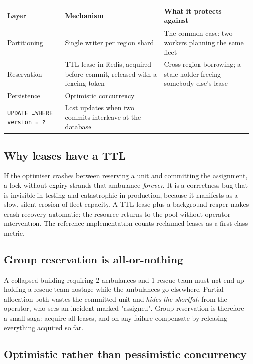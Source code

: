 \begin{center}\footnotesize
\begin{tabular}{@{}lp{44mm}p{50mm}@{}}
\toprule
\textbf{Layer} & \textbf{Mechanism} & \textbf{What it protects against} \\
\midrule
Partitioning & Single writer per region shard & The common case: two workers planning the same fleet \\
Reservation & TTL lease in Redis, acquired before commit, released with a fencing token & Cross-region borrowing; a stale holder freeing somebody else's lease \\
Persistence & Optimistic concurrency \\ \texttt{UPDATE \dots WHERE version = ?} & Lost updates when two commits interleave at the database \\
\bottomrule
\end{tabular}
\end{center}

\subsection{Why leases have a TTL}

If the optimiser crashes between reserving a unit and committing the
assignment, a lock without expiry strands that ambulance \emph{forever}. It is
a correctness bug that is invisible in testing and catastrophic in production,
because it manifests as a slow, silent erosion of fleet capacity. A TTL lease
plus a background reaper makes crash recovery automatic: the resource returns
to the pool without operator intervention. The reference implementation counts
reclaimed leases as a first-class metric.

\subsection{Group reservation is all-or-nothing}

A collapsed building requiring 2 ambulances and 1 rescue team must not end up
holding a rescue team hostage while the ambulances go elsewhere. Partial
allocation both wastes the committed unit and \emph{hides the shortfall} from
the operator, who sees an incident marked "assigned". Group reservation is
therefore a small saga: acquire all leases, and on any failure compensate by
releasing everything acquired so far.

\subsection{Optimistic rather than pessimistic concurrency}

